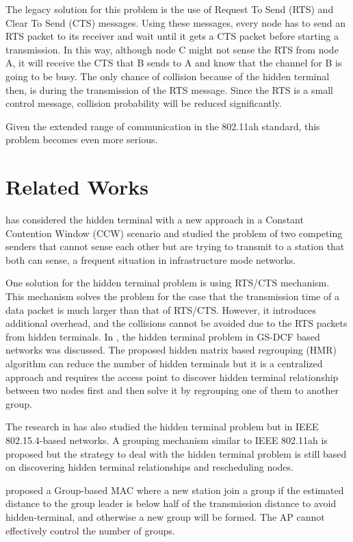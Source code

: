 The legacy solution for this problem is the use of Request To Send (RTS) and Clear To Send (CTS) messages. Using these messages, every node has to send an RTS packet to its receiver and wait until it gets a CTS packet before starting a transmission. In this way, although node C might not sense the RTS from node A, it will receive the CTS that B sends to A and know that the channel for B is going to be busy. The only chance of collision because of the hidden terminal then, is during the transmission of the RTS message. Since the RTS is a small control message, collision probability will be reduced significantly. 

Given the extended range of communication in the 802.11ah standard, this problem becomes even more serious.  

\section{Related Works}

\cite{tsertou2008revisiting} has considered the hidden terminal with a new approach in a Constant Contention Window (CCW) scenario and studied the problem of two competing senders that cannot sense each other but are trying to transmit to a station that both can sense, a frequent situation in infrastructure mode networks.

One solution for the hidden terminal problem is using RTS/CTS mechanism. This mechanism solves the problem for the case that the transmission time of a data packet is much larger than that of RTS/CTS. However, it introduces additional overhead, and the collisions cannot be avoided due to the RTS packets from hidden terminals. In \cite{yoonregrouping}, the hidden terminal problem in GS-DCF based networks was discussed. The proposed hidden matrix based regrouping (HMR) algorithm can reduce the number of hidden terminals but it is a centralized approach and requires the access point to discover hidden terminal relationship between two nodes first and then solve it by regrouping one of them to another group.

The research in \cite{tseng2014effective} has also studied the hidden terminal problem but in IEEE 802.15.4-based networks. A grouping mechanism similar to IEEE 802.11ah is proposed but the strategy to deal with the hidden terminal problem is still based on discovering hidden terminal relationships and rescheduling nodes.

\cite{abichar2013group} proposed a Group-based MAC where a new station join a group if the estimated distance to the group leader is below half of the transmission distance to avoid hidden-terminal, and otherwise a new group will be formed. The AP cannot effectively control the number of groups.

